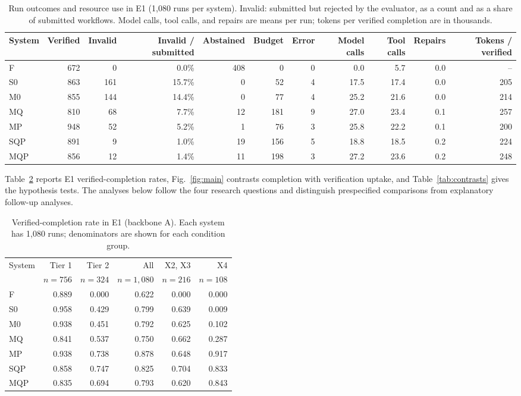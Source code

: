 \documentclass[conference]{IEEEtran}
\newcommand{\sys}[1]{\textsf{#1}}
\begin{document}
\begin{table}[t]
\caption{Run outcomes and resource use in E1 (1,080 runs per system). Invalid: submitted but rejected by the evaluator, as a count and as a share of submitted workflows. Model calls, tool calls, and repairs are means per run; tokens per verified completion are in thousands.}
\label{tab:outcomes}
\centering\footnotesize\setlength{\tabcolsep}{4pt}
\begin{tabular}{@{}lrrrrrrrrrr@{}}
\toprule
System & Verified & Invalid & Invalid / submitted & Abstained & Budget & Error & Model calls & Tool calls & Repairs & Tokens / verified \\
\midrule
\sys{F}   & 672 & 0   & 0.0\%  & 408 & 0   & 0 & 0.0  & 5.7  & 0.0 & -- \\
\sys{S0}  & 863 & 161 & 15.7\% & 0   & 52  & 4 & 17.5 & 17.4 & 0.0 & 205 \\
\sys{M0}  & 855 & 144 & 14.4\% & 0   & 77  & 4 & 25.2 & 21.6 & 0.0 & 214 \\
\sys{MQ}  & 810 & 68  & 7.7\%  & 12  & 181 & 9 & 27.0 & 23.4 & 0.1 & 257 \\
\sys{MP}  & 948 & 52  & 5.2\%  & 1   & 76  & 3 & 25.8 & 22.2 & 0.1 & 200 \\
\sys{SQP} & 891 & 9   & 1.0\%  & 19  & 156 & 5 & 18.8 & 18.5 & 0.2 & 224 \\
\sys{MQP} & 856 & 12  & 1.4\%  & 11  & 198 & 3 & 27.2 & 23.6 & 0.2 & 248 \\
\bottomrule
\end{tabular}
\end{table} Table~\ref{tab:main} reports E1 verified-completion rates, Fig.~\ref{fig:main} contrasts completion with verification uptake, and Table~\ref{tab:contrasts} gives the hypothesis tests. The analyses below follow the four research questions and distinguish prespecified comparisons from explanatory follow-up analyses.

\begin{table}[t]
\caption{Verified-completion rate in E1 (backbone A). Each system has 1,080 runs; denominators are shown for each condition group.}
\label{tab:main}
\centering\footnotesize\setlength{\tabcolsep}{4pt}
\begin{tabular}{@{}lrrrrr@{}}
\toprule
System & Tier 1 & Tier 2 & All & X2, X3 & X4 \\
 & $n=756$ & $n=324$ & $n=1{,}080$ & $n=216$ & $n=108$ \\
\midrule
\sys{F} & 0.889 & 0.000 & 0.622 & 0.000 & 0.000 \\
\sys{S0} & 0.958 & 0.429 & 0.799 & 0.639 & 0.009 \\
\sys{M0} & 0.938 & 0.451 & 0.792 & 0.625 & 0.102 \\
\sys{MQ} & 0.841 & 0.537 & 0.750 & 0.662 & 0.287 \\
\sys{MP} & 0.938 & 0.738 & 0.878 & 0.648 & 0.917 \\
\sys{SQP} & 0.858 & 0.747 & 0.825 & 0.704 & 0.833 \\
\sys{MQP} & 0.835 & 0.694 & 0.793 & 0.620 & 0.843 \\
\bottomrule
\end{tabular}
\end{table}
\end{document}
